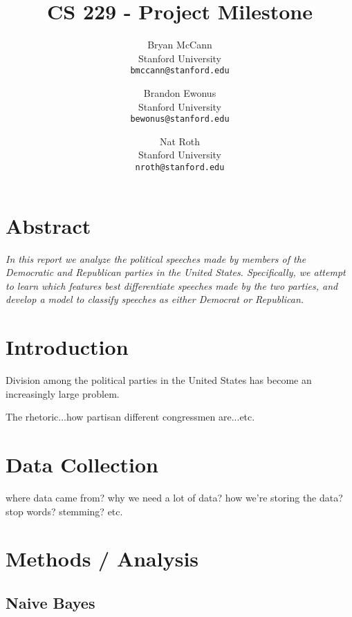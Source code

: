 \documentclass[twocolumn]{article}
\begin{document}
\author{
  Bryan McCann\\
  Stanford University\\
  \texttt{bmccann@stanford.edu}
  \and
  Brandon Ewonus\\
  Stanford University\\
  \texttt{bewonus@stanford.edu}
  \and
  Nat Roth\\
  Stanford University\\
  \texttt{nroth@stanford.edu}
}
\title{CS 229 - Project Milestone}
\date{}

\maketitle

\section*{Abstract}

\emph{In this report we analyze the political speeches made by members of the Democratic and Republican parties in the United States.  Specifically, we attempt to learn which features best differentiate speeches made by the two parties, and develop a model to classify speeches as either Democrat or Republican.}

\section{Introduction}

Division among the political parties in the United States has become an increasingly large problem.  

The rhetoric...how partisan different congressmen are...etc.

\section{Data Collection}

where data came from?  why we need a lot of data?  how we're storing the data?  stop words?  stemming?  etc.

\section{Methods / Analysis}

\subsection{Naive Bayes}
\end{document}

